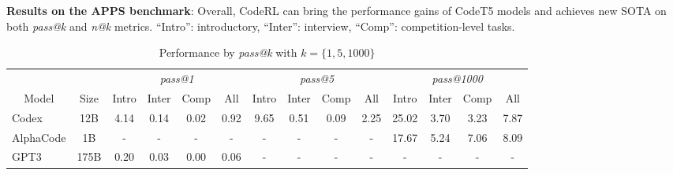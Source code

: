 \documentclass{article}
\begin{document}
\begin{table}[t]
\centering
\caption{\textbf{Results on the APPS benchmark}: 
Overall, CodeRL can bring the performance gains of CodeT5 models and achieves new SOTA on both \emph{pass@k} and \emph{n@k} metrics.
``Intro'': introductory, ``Inter'': interview, ``Comp'': competition-level tasks.
}
\begin{subtable}[htbp]{1.0\textwidth}
\centering
\caption{Performance by \emph{pass@k} with $k=\{1,5,1000\}$}
\label{tab:pass_k}
\resizebox{1.0\textwidth}{!} {
\begin{tabular}{lc|cccc|cccc|cccc}
\hline
\multicolumn{1}{c}{}                        &                        & \multicolumn{4}{c|}{\emph{pass@1}}                                       & \multicolumn{4}{c|}{\emph{pass@5}}                                        & \multicolumn{4}{c}{\emph{pass@1000}}                                        \\ 
\cline{3-14}
\multicolumn{1}{c}{\multirow{-2}{*}{Model}} & \multirow{-2}{*}{Size} & Intro         & Inter         & Comp          & All           & Intro          & Inter         & Comp          & All           & Intro          & Inter          & Comp           & All            \\\hline
Codex                                       & 12B                    & 4.14          & 0.14          & 0.02          & 0.92          & 9.65           & 0.51          & 0.09          & 2.25          & 25.02          & 3.70           & 3.23           & 7.87           \\
AlphaCode                                   & 1B                     & -             & -             & -             & -             & -              & -             & -             & -             & 17.67          & 5.24           & 7.06           & 8.09           \\
GPT3                                        & 175B                   & 0.20          & 0.03          & 0.00          & 0.06          & -           & -          & -          & -          & -              & -              & -              & -              \\


\end{tabular}}
\end{subtable}
\end{table}
\end{document}
